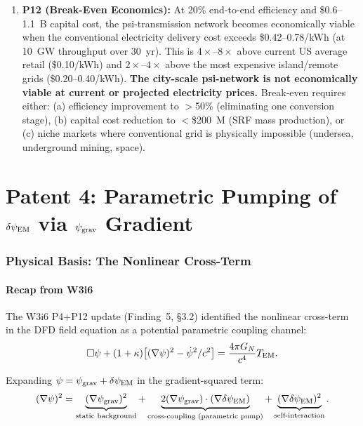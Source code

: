 \documentclass[11pt]{article}
\newcommand{\psigrav}{\psi_{\rm grav}}
\newcommand{\dpsiEM}{\delta\psi_{\rm EM}}
\newcommand{\GN}{G_N}
\begin{document}
\begin{enumerate}
\item \textbf{P12 (Break-Even Economics):} At 20\% end-to-end efficiency
  and \$0.6--1.1~B capital cost, the psi-transmission network becomes
  economically viable when the conventional electricity delivery cost
  exceeds \$0.42--0.78/kWh (at 10~GW throughput over 30~yr). This is
  $4\times$--$8\times$ above current US average retail (\$0.10/kWh)
  and $2\times$--$4\times$ above the most expensive island/remote grids
  (\$0.20--0.40/kWh). \textbf{The city-scale psi-network is not
  economically viable at current or projected electricity prices.}
  Break-even requires either: (a) efficiency improvement to $>$50\%
  (eliminating one conversion stage), (b) capital cost reduction to
  $<$\$200~M (SRF mass production), or (c) niche markets where
  conventional grid is physically impossible (undersea, underground
  mining, space).
\end{enumerate}

\part{Patent 4: Parametric Pumping of $\dpsiEM$ via $\psigrav$ Gradient}
\label{part:P4}

\section{Physical Basis: The Nonlinear Cross-Term}
\label{sec:P4-cross-term}

\subsection{Recap from W3i6}

The W3i6 P4+P12 update (Finding~5, \S3.2) identified the nonlinear
cross-term in the DFD field equation as a potential parametric coupling
channel:
\begin{equation}
\Box\psi + (1+\kappa)\bigl[(\nabla\psi)^2 - \dot\psi^2/c^2\bigr]
= \frac{4\pi\GN}{c^4}T_{\rm EM}.
\label{eq:DFD-field}
\end{equation}

Expanding $\psi = \psigrav + \dpsiEM$ in the gradient-squared term:
\begin{equation}
(\nabla\psi)^2 = \underbrace{(\nabla\psigrav)^2}_{\text{static background}}
+ \underbrace{2(\nabla\psigrav)\cdot(\nabla\dpsiEM)}_{\text{cross-coupling (parametric pump)}}
+ \underbrace{(\nabla\dpsiEM)^2}_{\text{self-interaction}}.
\label{eq:gradient-expansion}
\end{equation}
\end{document}
